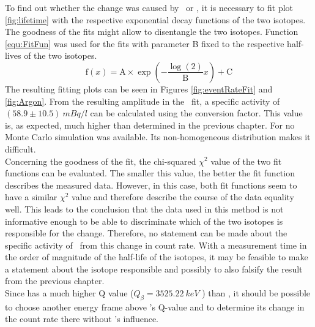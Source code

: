 \documentclass[encoding=utf8,british]{tumphthesis}
\begin{document}
To find out whether the change was caused by \Kr\ or , it is necessary to fit  plot \ref{fig:lifetime} with the respective exponential decay functions of the two isotopes.
The goodness of the fits might allow to disentangle the two isotopes.  
Function \ref{equ:FitFun} was used for the fits with parameter B fixed to the respective half-lives of the two isotopes.
\begin{equation}
\mathrm{f}(x) = \mathrm{A}\times\exp\left(-\frac{\log(2)}{\mathrm{B}} x \right) + \mathrm{C}
\label{equ:FitFun}
\end{equation}
The resulting fitting plots can be seen in Figures \ref{fig:eventRateFit} and \ref{fig:Argon}.
From the resulting amplitude in the \Kr\ fit, a specific activity of $(58.9\pm10.5) \  \unit{mBq}/\unit{l}$ can be calculated using the conversion factor.
This value is, as expected, much higher than determined in the previous chapter.
For  no Monte Carlo simulation was available.
Its non-homogeneous distribution makes it difficult.
\\

Concerning the goodness of the fit, the chi-squared $\chi^2$ value of the two fit functions can be evaluated.
The smaller this value, the better the fit function describes  the measured data.
However, in this case, both fit functions seem to have a similar $\chi^2$ value and therefore describe the course of the data equality well.
This leads to the conclusion that the data used in this method is not informative enough to be able to discriminate which of the two isotopes is responsible for the change.
Therefore, no statement can be made about the specific activity of \Kr\ from this change in count rate.
With a measurement time in the order of magnitude of the half-life of the isotopes, it may be feasible to make a statement about the isotope responsible and possibly to also falsify the result from the previous chapter.
\\

Since  has a much higher Q value ($Q_{\beta} = 3525.22 \ \unit{keV}$ \cite{chen_nuclear_2016}) than \Kr, it should be possible to choose another energy frame above \Kr's Q-value and to determine its change in the count rate there without \Kr's influence.








\end{document}
